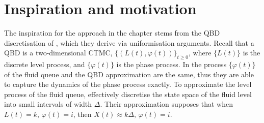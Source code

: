 \section{Inspiration and motivation}\label{sec: inspiration}
The inspiration for the approach in the chapter stems from the QBD discretisation of \cite{bo2013}, which they derive via uniformisation arguments. Recall that a QBD is a two-dimensional CTMC, \(\{(L(t),\varphi(t))\}_{t\geq 0}\), where \(\{L(t)\}\) is the discrete level process, and \(\{\varphi(t)\}\) is the phase process. In \cite{bo2013} the process \(\{\varphi(t)\}\) of the fluid queue and the QBD approximation are the same, thus they are able to capture the dynamics of the phase process exactly. To approximate the level process of the fluid queue, \cite{bo2013} effectively discretise the state space of the fluid level into small intervals of width \(\Delta\). Their approximation supposes that when \(L(t)=k,\,\varphi(t)=i\), then \(X(t)\approx k\Delta,\,\varphi(t)=i\). 

